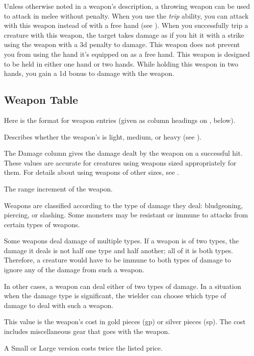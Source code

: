             Unless otherwise noted in a weapon's description, a throwing weapon can be used to attack in melee without penalty.
             When you use the \textit{trip} ability, you can attack with this weapon instead of with a free hand (see ).
            When you successfully trip a creature with this weapon, the target takes damage as if you hit it with a strike using the weapon with a \minus3d penalty to damage.
             This weapon does not prevent you from using the hand it's equipped on as a free hand.
             This weapon is designed to be held in either one hand or two hands.
            While holding this weapon in two hands, you gain a \plus1d bonus to damage with the weapon.

    \subsection{Weapon Table}
        Here is the format for weapon entries (given as column headings on , below).

         Describes whether the weapon's  is light, medium, or heavy (see ).

         The Damage column gives the damage dealt by the weapon on a successful hit.
        These values are accurate for creatures using weapons sized appropriately for them.
        For details about using weapons of other sizes, see .

         The range increment of the weapon.

         Weapons are classified according to the type of damage they deal: bludgeoning, piercing, or slashing. Some monsters may be resistant or immune to attacks from certain types of weapons.

        Some weapons deal damage of multiple types. If a weapon is of two types, the damage it deals is not half one type and half another; all of it is both types. Therefore, a creature would have to be immune to both types of damage to ignore any of the damage from such a weapon.

        In other cases, a weapon can deal either of two types of damage. In a situation when the damage type is significant, the wielder can choose which type of damage to deal with such a weapon.

         This value is the weapon's cost in gold pieces (gp) or silver pieces (sp). The cost includes miscellaneous gear that goes with the weapon.
        \par A Small or Large version costs twice the listed price.

